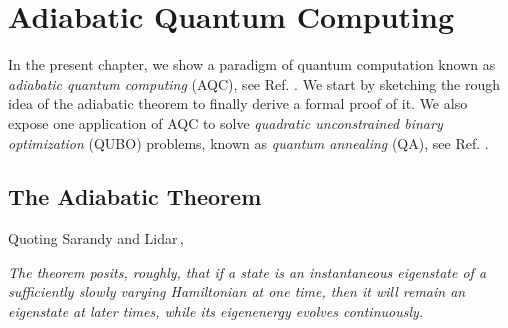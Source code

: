 
\chapter{Adiabatic Quantum Computing} %

\label{Chapter2} %
In the present chapter, we show a paradigm of quantum computation known as \textit{adiabatic quantum computing} (AQC), see Ref. \cite{Farhi2000QuantumEvolution}. We start by sketching the rough idea of the adiabatic theorem to finally derive a formal proof of it. We also expose one application of AQC to solve \textit{quadratic unconstrained binary optimization} (QUBO) problems, known as \textit{quantum annealing} (QA), see Ref. \cite{Kadowaki1998QuantumModel}.

\section{The Adiabatic Theorem}
Quoting Sarandy and Lidar\,\cite{Sarandy2005AdiabaticSystems},
\begin{displayquote}
\textit{The theorem posits, roughly, that if a state is an instantaneous eigenstate of a sufficiently slowly varying Hamiltonian at one time, then it will remain an eigenstate at later times, while its eigenenergy evolves continuously.}
\end{displayquote}
